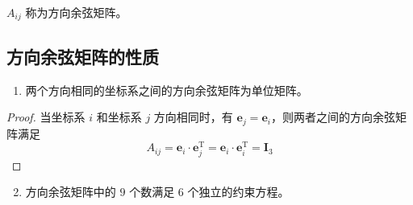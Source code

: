 $A_{ij}$ 称为方向余弦矩阵。


\subsection{方向余弦矩阵的性质}

\begin{enumerate}
\item 两个方向相同的坐标系之间的方向余弦矩阵为单位矩阵。
\end{enumerate}

\begin{proof}
当坐标系 $i$ 和坐标系 $j$ 方向相同时，有 $\boldsymbol{e}_j = \boldsymbol{e}_i$，则两者之间的方向余弦矩阵满足
\begin{equation*}
A_{ij} = \boldsymbol{e}_i \cdot \boldsymbol{e}_j^{\mathrm{T}} = \boldsymbol{e}_i \cdot \boldsymbol{e}_i^{\mathrm{T}} = \boldsymbol{I}_3
\end{equation*}
\end{proof}

\begin{enumerate}\setcounter{enumi}{1}
\item 方向余弦矩阵中的 $9$ 个数满足 $6$ 个独立的约束方程。
\end{enumerate}

